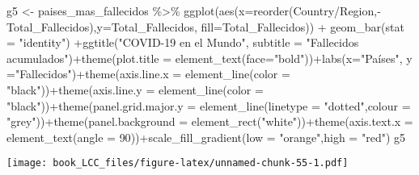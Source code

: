 \documentclass[
]{book}
\newenvironment{Shaded}{\begin{snugshade}}{\end{snugshade}}
\newcommand{\AttributeTok}[1]{\textcolor[rgb]{0.77,0.63,0.00}{#1}}
\newcommand{\DecValTok}[1]{\textcolor[rgb]{0.00,0.00,0.81}{#1}}
\newcommand{\FunctionTok}[1]{\textcolor[rgb]{0.00,0.00,0.00}{#1}}
\newcommand{\NormalTok}[1]{#1}
\newcommand{\OtherTok}[1]{\textcolor[rgb]{0.56,0.35,0.01}{#1}}
\newcommand{\SpecialCharTok}[1]{\textcolor[rgb]{0.00,0.00,0.00}{#1}}
\newcommand{\StringTok}[1]{\textcolor[rgb]{0.31,0.60,0.02}{#1}}
\begin{document}
\begin{Shaded}
\begin{Highlighting}[]
\NormalTok{g5 }\OtherTok{\textless{}{-}}\NormalTok{ paises\_mas\_fallecidos }\SpecialCharTok{\%\textgreater{}\%}
    \FunctionTok{ggplot}\NormalTok{(}\FunctionTok{aes}\NormalTok{(}\AttributeTok{x=}\FunctionTok{reorder}\NormalTok{(}\StringTok{\textasciigrave{}}\AttributeTok{Country/Region}\StringTok{\textasciigrave{}}\NormalTok{,}\SpecialCharTok{{-}}\NormalTok{Total\_Fallecidos),}\AttributeTok{y=}\NormalTok{Total\_Fallecidos, }\AttributeTok{fill=}\NormalTok{Total\_Fallecidos)) }\SpecialCharTok{+}  \FunctionTok{geom\_bar}\NormalTok{(}\AttributeTok{stat =} \StringTok{"identity"}\NormalTok{) }\SpecialCharTok{+}\FunctionTok{ggtitle}\NormalTok{(}\StringTok{"COVID{-}19 en el Mundo"}\NormalTok{, }\AttributeTok{subtitle =} \StringTok{"Fallecidos acumulados"}\NormalTok{)}\SpecialCharTok{+}\FunctionTok{theme}\NormalTok{(}\AttributeTok{plot.title =} \FunctionTok{element\_text}\NormalTok{(}\AttributeTok{face=}\StringTok{"bold"}\NormalTok{))}\SpecialCharTok{+}\FunctionTok{labs}\NormalTok{(}\AttributeTok{x=}\StringTok{"Países"}\NormalTok{, }\AttributeTok{y =}\StringTok{"Fallecidos"}\NormalTok{)}\SpecialCharTok{+}\FunctionTok{theme}\NormalTok{(}\AttributeTok{axis.line.x =} \FunctionTok{element\_line}\NormalTok{(}\AttributeTok{color =} \StringTok{"black"}\NormalTok{))}\SpecialCharTok{+}\FunctionTok{theme}\NormalTok{(}\AttributeTok{axis.line.y =} \FunctionTok{element\_line}\NormalTok{(}\AttributeTok{color =} \StringTok{"black"}\NormalTok{))}\SpecialCharTok{+}\FunctionTok{theme}\NormalTok{(}\AttributeTok{panel.grid.major.y =} \FunctionTok{element\_line}\NormalTok{(}\AttributeTok{linetype =} \StringTok{"dotted"}\NormalTok{,}\AttributeTok{colour =} \StringTok{"grey"}\NormalTok{))}\SpecialCharTok{+}\FunctionTok{theme}\NormalTok{(}\AttributeTok{panel.background =} \FunctionTok{element\_rect}\NormalTok{(}\StringTok{"white"}\NormalTok{))}\SpecialCharTok{+}\FunctionTok{theme}\NormalTok{(}\AttributeTok{axis.text.x =} \FunctionTok{element\_text}\NormalTok{(}\AttributeTok{angle =} \DecValTok{90}\NormalTok{))}\SpecialCharTok{+}\FunctionTok{scale\_fill\_gradient}\NormalTok{(}\AttributeTok{low =} \StringTok{"orange"}\NormalTok{,}\AttributeTok{high =} \StringTok{"red"}\NormalTok{)}
\NormalTok{g5}
\end{Highlighting}
\end{Shaded}

\texttt{[image: book\_LCC\_files/figure-latex/unnamed-chunk-55-1.pdf]}
\end{document}
